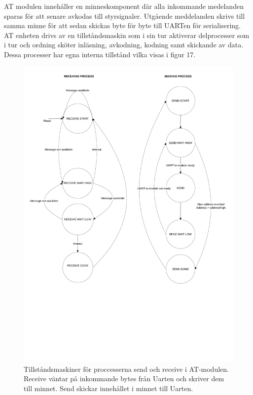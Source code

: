 \documentclass[a4paper]{scrartcl}
\begin{document}
		AT modulen innehåller en minneskomponent där alla inkommande medelanden sparas för att senare avkodas till styrsignaler. Utgående meddelanden skrivs till samma minne för att sedan skickas byte för byte till UARTen för serialisering.
		AT enheten drivs av en tillståndsmaskin som i sin tur aktiverar delprocesser som i tur och ordning sköter inläsning, avkodning, kodning samt skickande av data. Dessa processer har egna interna tillstånd vilka visas i figur 17.

		\begin{figure}[H]
			\centering
			\includegraphics[scale=0.4]{atprocessess.pdf}
			\caption{Tillståndsmaskiner för proccesserna send och receive i AT-modulen. Receive väntar på inkommande bytes från Uarten och skriver dem till minnet. Send skickar innehållet i minnet till Uarten.}
		\end{figure}
\end{document}
